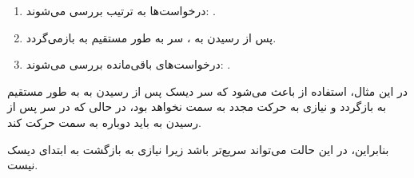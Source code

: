 \begin{qsolve}
\begin{enumerate}
		\item 
		درخواست‌ها به ترتیب بررسی می‌شوند: .
		
		\item 
		پس از رسیدن به ، سر به طور مستقیم به  بازمی‌گردد.
		
		\item 
		درخواست‌های باقی‌مانده بررسی می‌شوند: .
	\end{enumerate}
	
	در این مثال، استفاده از  باعث می‌شود که سر دیسک پس از رسیدن به  به طور مستقیم به  بازگردد و نیازی به حرکت مجدد به سمت  نخواهد بود، در حالی که در  سر پس از رسیدن به  باید دوباره به سمت  حرکت کند.
	
	بنابراین،  در این حالت می‌تواند سریع‌تر باشد زیرا نیازی به بازگشت به ابتدای دیسک نیست.
	
\end{qsolve}